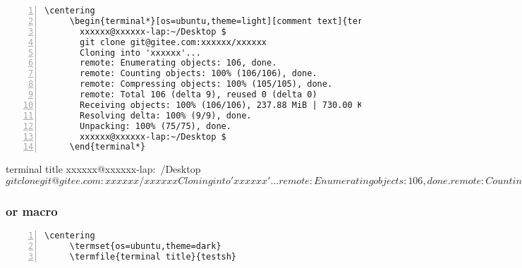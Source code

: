 \documentclass{ctxdoc}
\begin{document}
   \begin{Verbatim}[frame=none,numbers=left,gobble=5]
     \centering
     \begin{terminal*}[os=ubuntu,theme=light][comment text]{terminal title}
       xxxxxx@xxxxxx-lap:~/Desktop $
       git clone git@gitee.com:xxxxxx/xxxxxx
       Cloning into 'xxxxxx'...
       remote: Enumerating objects: 106, done.
       remote: Counting objects: 100% (106/106), done.
       remote: Compressing objects: 100% (105/105), done.
       remote: Total 106 (delta 9), reused 0 (delta 0)
       Receiving objects: 100% (106/106), 237.88 MiB | 730.00 KiB/s, done.
       Resolving delta: 100% (9/9), done.
       Unpacking: 100% (75/75), done.
       xxxxxx@xxxxxx-lap:~/Desktop $
     \end{terminal*}
   \end{Verbatim}
\newpage
\begin{center}
\begin{minipage}{0.85\textwidth}
\begin{terminal*}{terminal title}
  xxxxxx@xxxxxx-lap:~/Desktop $
  git clone git@gitee.com:xxxxxx/xxxxxx
  Cloning into 'xxxxxx'...
  remote: Enumerating objects: 106, done.
  remote: Counting objects: 100%
  remote: Compressing objects: 100%
  remote: Total 106 (delta 9), reused 0 (delta 0)
  Receiving objects: 100%
  Resolving delta: 100%
  Unpacking: 100%
  xxxxxx@xxxxxx-lap:~/Desktop $
\end{terminal*}
\end{minipage}
\end{center}

 \subsubsection{ or  macro}

   \begin{Verbatim}[frame=none,numbers=left]
     \centering
     \termset{os=ubuntu,theme=dark}
     \termfile{terminal title}{testsh}
   \end{Verbatim}

\begin{center}
\begin{minipage}{0.85\textwidth}
\end{minipage}
\end{center}
\end{document}
